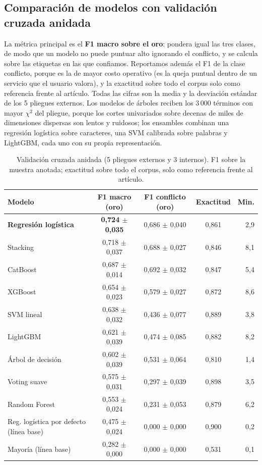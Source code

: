 \documentclass[11pt,a4paper]{article}
\begin{document}
\subsection{Comparación de modelos con validación cruzada anidada}
La métrica principal es el \textbf{F1 macro sobre el oro}: pondera igual las tres clases, de modo
que un modelo no puede puntuar alto ignorando el conflicto, y se calcula sobre las etiquetas en
las que confiamos. Reportamos además el F1 de la clase conflicto, porque es la de mayor costo
operativo (es la queja puntual dentro de un servicio que el usuario valora), y la exactitud
sobre todo el corpus solo como referencia frente al artículo. Todas las cifras son la media y la
desviación estándar de los 5 pliegues externos. Los modelos de árboles reciben los 3\,000 términos
con mayor $\chi^2$ del pliegue, porque los cortes univariados sobre decenas de miles de
dimensiones dispersas son lentos y ruidosos; los ensambles combinan una regresión logística sobre
caracteres, una SVM calibrada sobre palabras y LightGBM, cada uno con su propia representación.

\begin{table}[h]
\centering\small
\caption{Validación cruzada anidada (5 pliegues externos y 3 internos). F1 sobre la muestra anotada; exactitud sobre todo el corpus, solo como referencia frente al artículo.}\label{tab:anidada}
\begin{tabular}{lcccr}
\toprule
Modelo & F1 macro (oro) & F1 conflicto (oro) & Exactitud & Min. \\
\midrule
\textbf{Regresión logística} & \textbf{0{,}724 $\pm$ 0{,}035} & 0{,}686 $\pm$ 0{,}040 & 0{,}861 & 2{,}9 \\
Stacking & 0{,}718 $\pm$ 0{,}037 & 0{,}688 $\pm$ 0{,}027 & 0{,}846 & 8{,}1 \\
CatBoost & 0{,}687 $\pm$ 0{,}014 & 0{,}692 $\pm$ 0{,}032 & 0{,}847 & 5{,}4 \\
XGBoost & 0{,}654 $\pm$ 0{,}023 & 0{,}579 $\pm$ 0{,}027 & 0{,}872 & 8{,}6 \\
SVM lineal & 0{,}638 $\pm$ 0{,}032 & 0{,}436 $\pm$ 0{,}077 & 0{,}889 & 3{,}8 \\
LightGBM & 0{,}621 $\pm$ 0{,}039 & 0{,}474 $\pm$ 0{,}085 & 0{,}882 & 8{,}2 \\
Árbol de decisión & 0{,}602 $\pm$ 0{,}039 & 0{,}531 $\pm$ 0{,}064 & 0{,}810 & 1{,}4 \\
Voting suave & 0{,}575 $\pm$ 0{,}031 & 0{,}297 $\pm$ 0{,}039 & 0{,}898 & 3{,}5 \\
Random Forest & 0{,}553 $\pm$ 0{,}024 & 0{,}231 $\pm$ 0{,}053 & 0{,}879 & 6{,}2 \\
Reg. logística por defecto (línea base) & 0{,}475 $\pm$ 0{,}024 & 0{,}000 $\pm$ 0{,}000 & 0{,}900 & 0{,}2 \\
Mayoría (línea base) & 0{,}282 $\pm$ 0{,}000 & 0{,}000 $\pm$ 0{,}000 & 0{,}531 & 0{,}1 \\
\bottomrule
\end{tabular}
\end{table}
\end{document}

